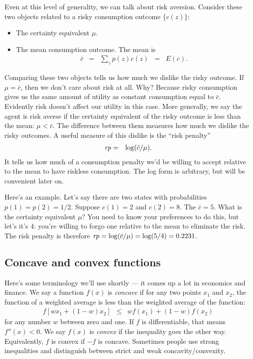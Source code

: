 \documentclass[11pt]{article}
\newcommand{\rp}{\mbox{\it rp\/}}
\newcommand{\cbar}{\bar{c}}
\begin{document}
Even at this level of generality, we can talk about risk aversion.
Consider these two objects related to a risky consumption
outcome $\{ c(z)\}$:
%
\begin{itemize}
\item The certainty equivalent $\mu$.

\item The mean consumption outcome.  The mean is
\begin{eqnarray*}
    \cbar &=& \sum_z p(z) c(z) \;\;=\;\; E(c) .
\end{eqnarray*}
\end{itemize}
%
Comparing these two objects tells us how much we dislike
the risky outcome.
If $\mu = \cbar$,
then we don't care about risk at all.
Why?
Because risky consumption gives us the same amount
of utility as constant consumption equal to $\cbar$.
Evidently risk doesn't affect our utility in this case.
More generally, we say the agent is risk averse if
the certainty equivalent of the risky outcome
is less than the mean:   $\mu < \cbar$.
The difference between them measures how much we dislike the risky outcomes.
A useful measure of this dislike is the ``risk penalty''
\begin{eqnarray}
    \rp &=& \log (\cbar/\mu)  .
    \label{eq:rp-def}
\end{eqnarray}
It tells us how much of a consumption penalty we'd be willing to accept
relative to the mean to have riskless consumption.
The log form is arbitrary, but will be convenient later on.

Here's an example.
Let's say there are two states with probabilities
$p(1) = p(2) = 1/2$.
Suppose $c(1) = 2$ and $c(2) = 8$.
The $\cbar = 5$.
What is the certainty equivalent $\mu$?
You need to know your preferences to do this,
but let's it's 4:  you're willing to forgo one
relative to the mean to eliminate the risk.
The risk penalty is therefore
$ \rp = \log (\cbar/\mu) = \log(5/4) = 0.2231$.


\subsection*{Concave and convex functions}

Here's some terminology we'll use shortly --- it comes up a lot
in economics and finance.
We say a function $f(x)$ is {\it concave\/}
if for any two points $x_1$ and $x_2$,
the function of a weighted average is less than the
weighted average of the function:
\begin{eqnarray*}
    f[ w x_1 + (1-w) x_2] &\leq&  w f(x_1) + (1-w) f(x_2)
\end{eqnarray*}
for any number $w$ between zero and one.
If $f$ is differentiable, that means $f''(x) < 0$.
We say $f(x)$ is  {\it convex\/}
if the inequality goes the other way.
Equivalently, $f$ is convex if $-f$ is concave.
Sometimes people use strong inequalities and distinguish
between strict and weak concavity/convexity.
\end{document}
